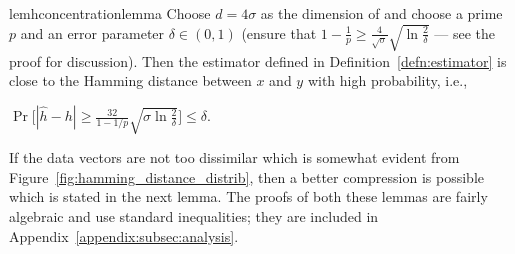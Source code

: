 \begin{restatable}{lem}{hconcentrationlemma}\label{lem:hconcentrationlemma}
    Choose $d=4\sigma$ as the dimension of \fsketch and choose a prime $p$ and
    an error parameter $\delta \in (0,1)$ (ensure that $1-\tfrac{1}{p} \ge
    \tfrac{4}{\sqrt{\sigma}} \sqrt{\ln \tfrac{2}{\delta}}$ --- see
    the proof for discussion). Then the estimator defined in
    Definition~\ref{defn:estimator} is close to the Hamming distance between $x$ and $y$ with high
    probability, i.e.,\\
    \centerline{$\displaystyle\Pr\big[|\hat{h}-h| \ge \tfrac{32}{1-1/p}\sqrt{\sigma \ln \tfrac{2}{\delta}} \big] \le \delta$.}
\end{restatable}




If the data vectors are not too dissimilar which is somewhat evident from Figure~\ref{fig:hamming_distance_distrib}, then a better compression is possible which is stated in the next lemma.
The proofs of both these lemmas are fairly algebraic and use standard inequalities; they are included in Appendix~\ref{appendix:subsec:analysis}.

    

    
    
